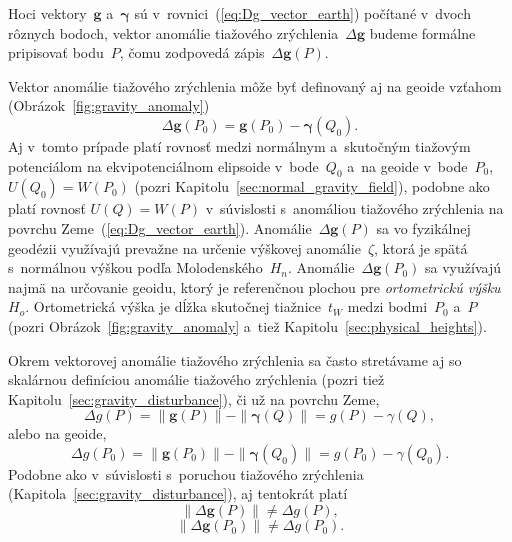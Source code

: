 \documentclass[a4paper, 12pt]{book}
\let\vec\mathbf
\begin{document}
Hoci vektory~$\vec g$ a~$\boldsymbol\gamma$ sú 
v~rovnici~(\ref{eq:Dg_vector_earth}) počítané v~dvoch rôznych bodoch, vektor 
anomálie tiažového zrýchlenia~$\Delta \vec g$ budeme formálne pripisovať 
bodu~$P$, čomu zodpovedá zápis~$\Delta \vec g(P)$.

Vektor anomálie tiažového zrýchlenia môže byť definovaný aj na geoide vzťahom 
(Obrázok~\ref{fig:gravity_anomaly})
%
\begin{equation}
\label{eq:Dg_vector_geoid}
\Delta \vec g(P_0) = \vec g(P_0) - \boldsymbol\gamma(Q_0){.}
\end{equation}
%
Aj v~tomto prípade platí rovnosť medzi normálnym a~skutočným tiažovým 
potenciálom na ekvipotenciálnom elipsoide v~bode~$Q_0$ a~na geoide 
v~bode~$P_0$, $U(Q_0) = W(P_0)$ (pozri 
Kapitolu~\ref{sec:normal_gravity_field}), podobne ako platí rovnosť $U(Q) 
= W(P)$ v~súvislosti s~anomáliou tiažového zrýchlenia na povrchu 
Zeme~(\ref{eq:Dg_vector_earth}).  Anomálie~$\Delta \vec g(P)$ sa vo fyzikálnej 
geodézii využívajú prevažne na určenie výškovej anomálie~$\zeta$, ktorá je 
spätá s~normálnou výškou podľa Molodenského~$H_n$.  Anomálie~$\Delta \vec 
g(P_0)$ sa využívajú najmä na určovanie geoidu, ktorý je referenčnou plochou 
pre \emph{ortometrickú výšku}~$H_o$.  Ortometrická výška je dĺžka skutočnej 
tiažnice~$t_W$ medzi bodmi~$P_0$ a~$P$ (pozri Obrázok~\ref{fig:gravity_anomaly} 
a~tiež Kapitolu~\ref{sec:physical_heights}).

Okrem vektorovej anomálie tiažového zrýchlenia sa často stretávame aj so 
skalárnou definíciou anomálie tiažového zrýchlenia (pozri tiež 
Kapitolu~\ref{sec:gravity_disturbance}), či už na povrchu Zeme,
%
\begin{equation}
\label{eq:Dg_scalar_earth}
\Delta g(P) = \| \vec g(P) \| - \| \boldsymbol \gamma (Q) \| = g(P) 
- \gamma(Q){,}
\end{equation}
%
alebo na geoide,
%
\begin{equation}
\label{eq:Dg_scalar_geoid}
\Delta g(P_0) = \| \vec g(P_0) \| - \| \boldsymbol \gamma (Q_0) \| = g(P_0) 
- \gamma(Q_0){.}
\end{equation}
%
Podobne ako v~súvislosti s~poruchou tiažového zrýchlenia 
(Kapitola~\ref{sec:gravity_disturbance}), aj tentokrát platí
%
\begin{equation}
\| \Delta \vec g(P) \| \neq \Delta g(P){,}
\end{equation}
%
\begin{equation}
\| \Delta \vec g(P_0) \| \neq \Delta g(P_0){.}
\end{equation}
\end{document}
